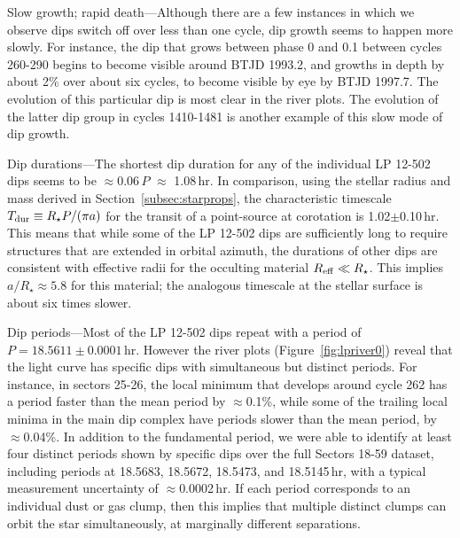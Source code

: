 \documentclass[11pt,twocolumn,tighten]{aastex63}
\begin{document}
{\sc Slow growth; rapid death}---Although there are a few instances in
which we observe dips switch off over less than one cycle, dip growth
seems to happen more slowly.  For instance, the dip that grows between
phase 0 and 0.1 between cycles 260-290 begins to become visible around
BTJD 1993.2, and growths in depth by about 2\% over about six cycles,
to become visible by eye by BTJD 1997.7.  The evolution of this
particular dip is most clear in the river plots.  The evolution of the
latter dip group in cycles 1410-1481 is another example of this slow
mode of dip growth.


{\sc Dip durations}---The shortest dip duration for any of the
individual LP 12-502 dips seems to be $\approx$0.06\,$P$ $\approx$
1.08\,hr.  In comparison, using the stellar radius and mass derived in
Section~\ref{subsec:starprops}, the characteristic timescale $T_{\rm
dur} \equiv R_\star P / (\pi a)$ for the transit of a point-source at
corotation is 1.02$\pm$0.10\,hr.  This means that while some of the LP
12-502 dips are sufficiently long to require structures that are
extended in orbital azimuth, the durations of other dips are
consistent with effective radii for the occulting material $R_{\rm
eff} \ll R_\star$.  This implies $a/R_\star \approx 5.8$ for this
material; the analogous timescale at the stellar surface is about six
times slower.

{\sc Dip periods}---Most of the LP 12-502 dips repeat with a period of
$P=18.5611 \pm 0.0001$\,hr.  However the river plots
(Figure~\ref{fig:lpriver0}) reveal that the light curve has specific
dips with simultaneous but distinct periods.  For instance, in sectors
25-26, the local minimum that develops around cycle 262 has a period
faster than the mean period by $\approx$0.1\%, while some of the
trailing local minima in the main dip complex have periods slower than
the mean period, by $\approx$0.04\%.  In addition to the fundamental
period, we were able to identify at least four distinct periods shown
by specific dips over the full Sectors 18-59 dataset, including
periods at 18.5683, 18.5672, 18.5473, and 18.5145\,hr, with a typical
measurement uncertainty of $\approx$0.0002\,hr.  If each period
corresponds to an individual dust or gas clump, then this implies that
multiple distinct clumps can orbit the star simultaneously, at
marginally different separations.
\end{document}
